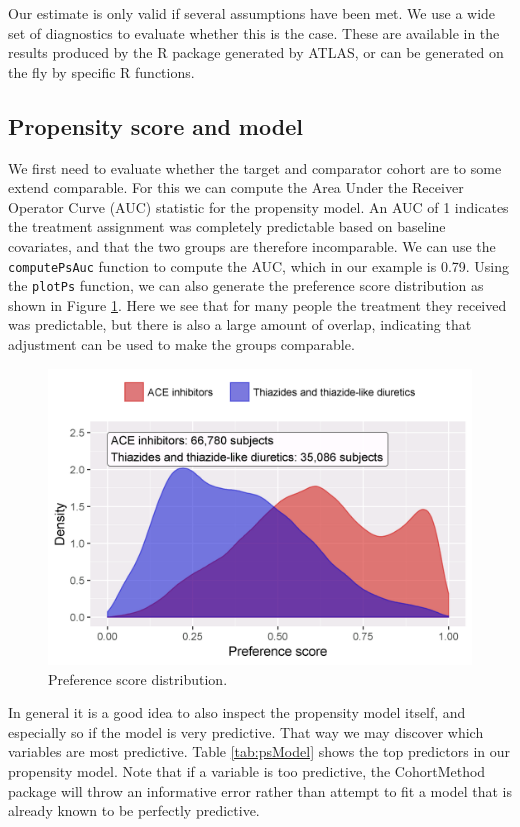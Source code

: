 \documentclass[11pt]{book}
\begin{document}
Our estimate is only valid if several assumptions have been met. We use
a wide set of diagnostics to evaluate whether this is the case. These
are available in the results produced by the R package generated by
ATLAS, or can be generated on the fly by specific R functions.

\subsection{Propensity score and
model}\label{propensity-score-and-model}

We first need to evaluate whether the target and comparator cohort are
to some extend comparable. For this we can compute the Area Under the
Receiver Operator Curve (AUC) statistic for the propensity model. An AUC
of 1 indicates the treatment assignment was completely predictable based
on baseline covariates, and that the two groups are therefore
incomparable. We can use the \texttt{computePsAuc} function to compute
the AUC, which in our example is 0.79. Using the \texttt{plotPs}
function, we can also generate the preference score distribution as
shown in Figure \ref{fig:ps}. Here we see that for many people the
treatment they received was predictable, but there is also a large
amount of overlap, indicating that adjustment can be used to make the
groups comparable.

\begin{figure}

{\centering \includegraphics[width=0.8\linewidth]{images/PopulationLevelEstimation/ps} 

}

\caption{Preference score distribution.}\label{fig:ps}
\end{figure}

In general it is a good idea to also inspect the propensity model
itself, and especially so if the model is very predictive. That way we
may discover which variables are most predictive. Table
\ref{tab:psModel} shows the top predictors in our propensity model. Note
that if a variable is too predictive, the CohortMethod package will
throw an informative error rather than attempt to fit a model that is
already known to be perfectly predictive.
\end{document}
